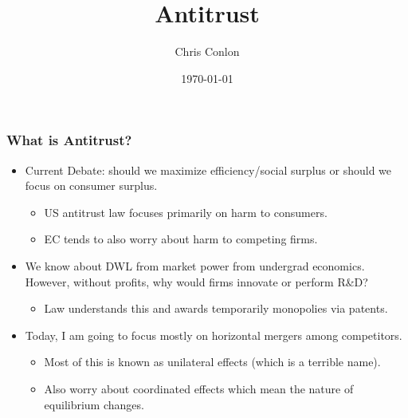 \def\beamerclassoptions{[xcolor=pdftex,dvipsnames,table,mathserif,aspectratio=169]}



\usepackage[english]{babel}
\usepackage{pgf,pgfarrows,pgfnodes,pgfautomata,pgfheaps}
\usepackage{amsmath,amssymb,setspace,centernot}
\usepackage[latin1]{inputenc}
\usepackage[T1]{fontenc}
\usepackage{relsize}
\usepackage{stmaryrd}
\usepackage{pdfpages}
\usepackage{booktabs}
\usepackage[absolute,overlay]{textpos} 


\newenvironment{reference}[2]{%
  \begin{textblock*}{\textwidth}(#1,#2) 
      \footnotesize\it\bgroup\color{red!50!black}}{\egroup\end{textblock*}} 


\title{Antitrust}
\author{Chris Conlon}
\date{\today}

\frame{\titlepage}

\begin{frame}
\frametitle{What is Antitrust?}
 \begin{itemize}
\item Current Debate: should we maximize \alert{efficiency/social surplus} or should we focus on \alert{consumer surplus}.
\begin{itemize}
\item US antitrust law focuses primarily on harm to consumers.
\item EC tends to also worry about harm to competing firms.
 \end{itemize}
 \item We know about DWL from market power from undergrad economics. However, without profits, why would firms innovate or perform R\&D?
 \begin{itemize}
\item Law understands this and awards temporarily monopolies via patents.
 \end{itemize}
\item Today, I am going to focus mostly on \alert{horizontal mergers} among competitors.
\begin{itemize}
\item Most of this is known as \alert{unilateral effects} (which is a terrible name).
\item Also worry about \alert{coordinated effects} which mean the nature of equilibrium changes.
 \end{itemize}
 \end{itemize}
\end{frame}

